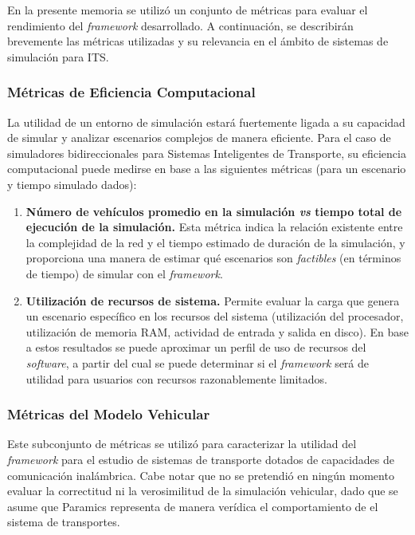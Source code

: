 En la presente memoria se utilizó un conjunto de métricas para evaluar el rendimiento del \emph{framework} desarrollado. A continuación, se describirán brevemente las métricas utilizadas y su relevancia en el ámbito de sistemas de simulación para ITS.

\subsubsection{Métricas de Eficiencia Computacional}\label{sec:eval_metrics:efficiency}

La utilidad de un entorno de simulación estará fuertemente ligada a su capacidad de simular y analizar escenarios complejos de manera eficiente. Para el caso de simuladores bidireccionales para Sistemas Inteligentes de Transporte, su eficiencia computacional puede medirse en base a las siguientes métricas (para un escenario y tiempo simulado dados):

\begin{enumerate}
    \item \textbf{Número de vehículos promedio en la simulación \emph{vs} tiempo total de ejecución de la simulación.} Esta métrica indica la relación existente entre la complejidad de la red y el tiempo estimado de duración de la simulación, y proporciona una manera de estimar qué escenarios son \emph{factibles} (en términos de tiempo) de simular con el \emph{framework}.
    
    \item \textbf{Utilización de recursos de sistema.} Permite evaluar la carga que genera un escenario específico en los recursos del sistema (utilización del procesador, utilización de memoria RAM, actividad de entrada y salida en disco). En base a estos resultados se puede aproximar un perfil de uso de recursos del \emph{software}, a partir del cual se puede determinar si el \emph{framework} será de utilidad para usuarios con recursos razonablemente limitados.
\end{enumerate}

\subsubsection{Métricas del Modelo Vehicular}\label{sec:eval_metrics:vehicular}

Este subconjunto de métricas se utilizó para caracterizar la utilidad del \emph{framework} para el estudio de sistemas de transporte dotados de capacidades de comunicación inalámbrica. Cabe notar que no se pretendió en ningún momento evaluar la correctitud ni la verosimilitud de la simulación vehicular, dado que se asume que Paramics representa de manera verídica el comportamiento de el sistema de transportes.

